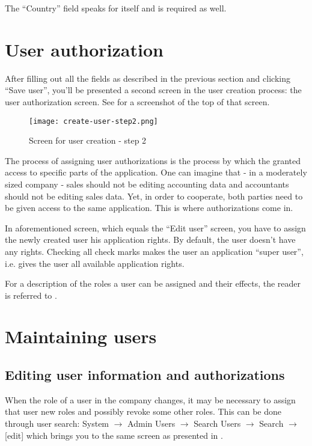 The ``Country'' field speaks for itself and is required as well.


\section{User authorization}


After filling out all the fields as described in the previous section and
clicking ``Save user'', you'll be presented
a second screen in the user creation process: the user authorization screen.
See  for a screenshot of the top of that screen.

\begin{figure}[h]
\texttt{[image: create-user-step2.png]}
\caption{Screen for user creation - step 2}
\label{fig:create-user-step2}
\end{figure}


The process of assigning user authorizations is the process by which the granted
access to specific parts of the application. One can imagine that - in a moderately
sized company - sales should not be editing accounting data and accountants should
not be editing sales data. Yet, in order to cooperate, both parties need to be
given access to the same application. This is where authorizations come in.

In aforementioned screen, which equals the ``Edit user'' screen, you have to assign the
newly created user his application rights. By default, the user doesn't have any
rights. Checking all check marks makes the user an application ``super user'', i.e.
gives the user all available application rights.

For a description of the roles a user can be assigned and their effects, the
reader is referred to .


\section{Maintaining users}

\subsection{Editing user information and authorizations}

When the role of a user in the company changes, it may be necessary to assign
that user new roles and possibly revoke some other roles. This can be done through
user search: System $\rightarrow$ Admin Users $\rightarrow$ Search Users $\rightarrow$ Search $\rightarrow$ {[}edit] which brings you to the same screen as presented in
.

